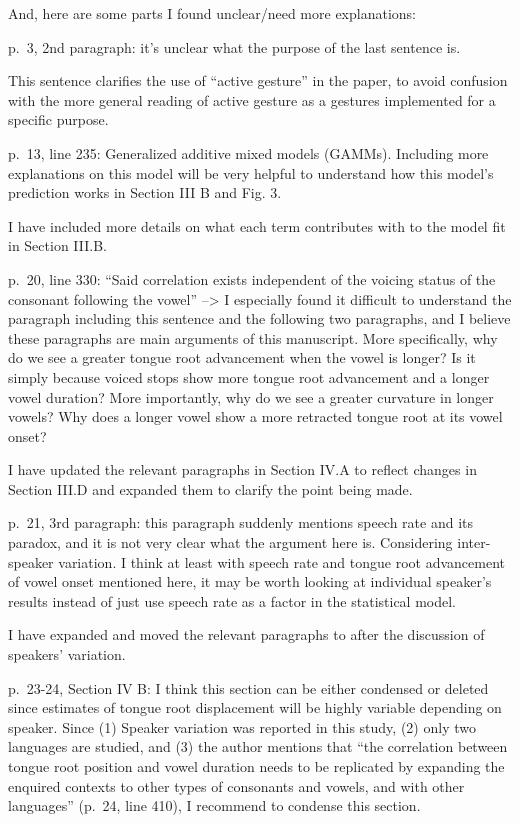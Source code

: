 \documentclass[]{article}
\begin{document}
And, here are some parts I found unclear/need more explanations:

p.~3, 2nd paragraph: it's unclear what the purpose of the last sentence
is.

\color{plum}

This sentence clarifies the use of ``active gesture'' in the paper, to
avoid confusion with the more general reading of active gesture as a
gestures implemented for a specific purpose. \color{black}

p.~13, line 235: Generalized additive mixed models (GAMMs). Including
more explanations on this model will be very helpful to understand how
this model's prediction works in Section III B and Fig. 3.

\color{plum}

I have included more details on what each term contributes with to the
model fit in Section III.B. \color{black}

p.~20, line 330: ``Said correlation exists independent of the voicing
status of the consonant following the vowel'' --\textgreater{} I
especially found it difficult to understand the paragraph including this
sentence and the following two paragraphs, and I believe these
paragraphs are main arguments of this manuscript. More specifically, why
do we see a greater tongue root advancement when the vowel is longer? Is
it simply because voiced stops show more tongue root advancement and a
longer vowel duration? More importantly, why do we see a greater
curvature in longer vowels? Why does a longer vowel show a more
retracted tongue root at its vowel onset?

\color{plum}

I have updated the relevant paragraphs in Section IV.A to reflect
changes in Section III.D and expanded them to clarify the point being
made. \color{black}

p.~21, 3rd paragraph: this paragraph suddenly mentions speech rate and
its paradox, and it is not very clear what the argument here is.
Considering inter-speaker variation. I think at least with speech rate
and tongue root advancement of vowel onset mentioned here, it may be
worth looking at individual speaker's results instead of just use speech
rate as a factor in the statistical model.

\color{plum}

I have expanded and moved the relevant paragraphs to after the
discussion of speakers' variation. \color{black}

p.~23-24, Section IV B: I think this section can be either condensed or
deleted since estimates of tongue root displacement will be highly
variable depending on speaker. Since (1) Speaker variation was reported
in this study, (2) only two languages are studied, and (3) the author
mentions that ``the correlation between tongue root position and vowel
duration needs to be replicated by expanding the enquired contexts to
other types of consonants and vowels, and with other languages'' (p.~24,
line 410), I recommend to condense this section.
\end{document}
